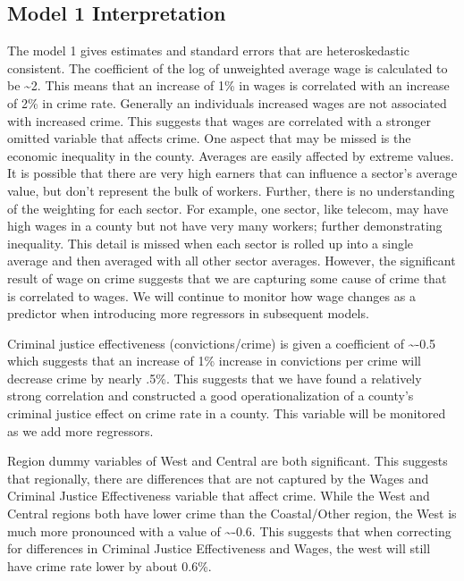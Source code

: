 \documentclass[]{article}
\begin{document}
\hypertarget{model-1-interpretation}{%
\subsection{Model 1 Interpretation}\label{model-1-interpretation}}

The model 1 gives estimates and standard errors that are heteroskedastic
consistent. The coefficient of the log of unweighted average wage is
calculated to be \textasciitilde{}2. This means that an increase of 1\%
in wages is correlated with an increase of 2\% in crime rate. Generally
an individuals increased wages are not associated with increased crime.
This suggests that wages are correlated with a stronger omitted variable
that affects crime. One aspect that may be missed is the economic
inequality in the county. Averages are easily affected by extreme
values. It is possible that there are very high earners that can
influence a sector's average value, but don't represent the bulk of
workers. Further, there is no understanding of the weighting for each
sector. For example, one sector, like telecom, may have high wages in a
county but not have very many workers; further demonstrating inequality.
This detail is missed when each sector is rolled up into a single
average and then averaged with all other sector averages. However, the
significant result of wage on crime suggests that we are capturing some
cause of crime that is correlated to wages. We will continue to monitor
how wage changes as a predictor when introducing more regressors in
subsequent models.

Criminal justice effectiveness (convictions/crime) is given a
coefficient of \textasciitilde{}-0.5 which suggests that an increase of
1\% increase in convictions per crime will decrease crime by nearly
.5\%. This suggests that we have found a relatively strong correlation
and constructed a good operationalization of a county's criminal justice
effect on crime rate in a county. This variable will be monitored as we
add more regressors.

Region dummy variables of West and Central are both significant. This
suggests that regionally, there are differences that are not captured by
the Wages and Criminal Justice Effectiveness variable that affect crime.
While the West and Central regions both have lower crime than the
Coastal/Other region, the West is much more pronounced with a value of
\textasciitilde{}-0.6. This suggests that when correcting for
differences in Criminal Justice Effectiveness and Wages, the west will
still have crime rate lower by about 0.6\%.
\end{document}
